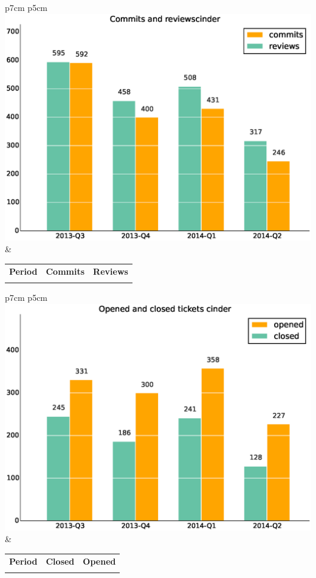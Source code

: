 \documentclass[a4wide,11pt]{report}
\begin{document}
\begin{tabular}{p{7cm} p{5cm}}
    \vspace{0pt} 
    \includegraphics[scale=.35]{figs/commitscinder.eps}
    & 
    \vspace{0pt}
    \begin{tabular}{l|r|r|}%
    \bfseries Period & \bfseries Commits & \bfseries Reviews %
    \csvreader[head to column names]{data/commitscinder.csv}{}%
    {\\ & \commits & \submitted}
    \end{tabular}
\end{tabular}

\begin{tabular}{p{7cm} p{5cm}}
    \vspace{0pt} 
    \includegraphics[scale=.35]{figs/closedcinder.eps}
    & 
    \vspace{0pt}
    \begin{tabular}{l|r|r|}%
    \bfseries Period & \bfseries Closed & \bfseries Opened
    \csvreader[head to column names]{data/closedcinder.csv}{}%
    {\\ & \closed & \opened}
    \end{tabular}
\end{tabular}
\end{document}
